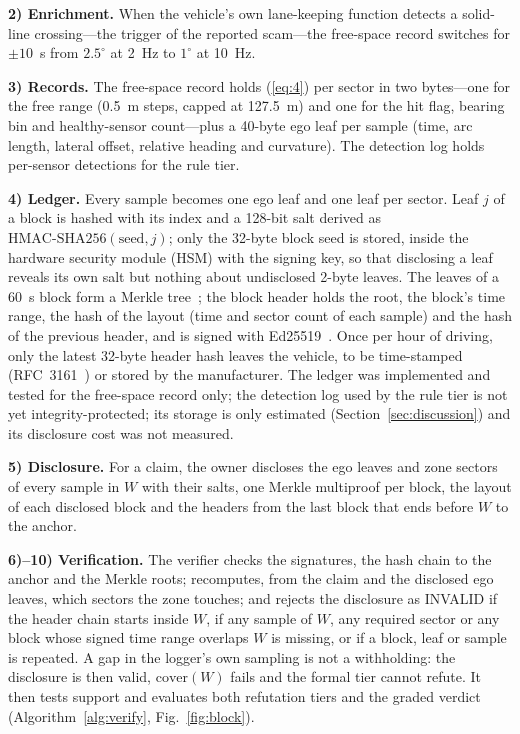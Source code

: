 \textbf{2) Enrichment.} When the vehicle's own lane-keeping function detects a solid-line crossing---the trigger of the reported scam---the free-space record switches for $\pm 10$~s from $2.5^\circ$ at 2~Hz to $1^\circ$ at 10~Hz.

\textbf{3) Records.} The free-space record holds (\ref{eq:4}) per sector in two bytes---one for the free range (0.5~m steps, capped at 127.5~m) and one for the hit flag, bearing bin and healthy-sensor count---plus a 40-byte ego leaf per sample (time, arc length, lateral offset, relative heading and curvature). The detection log holds per-sensor detections for the rule tier.

\textbf{4) Ledger.} Every sample becomes one ego leaf and one leaf per sector. Leaf $j$ of a block is hashed with its index and a 128-bit salt derived as $\mathrm{HMAC\text{-}SHA256}(\text{seed}, j)$; only the 32-byte block seed is stored, inside the hardware security module (HSM) with the signing key, so that disclosing a leaf reveals its own salt but nothing about undisclosed 2-byte leaves. The leaves of a 60~s block form a Merkle tree~\cite{b42}; the block header holds the root, the block's time range, the hash of the layout (time and sector count of each sample) and the hash of the previous header, and is signed with Ed25519~\cite{b43}. Once per hour of driving, only the latest 32-byte header hash leaves the vehicle, to be time-stamped (RFC~3161~\cite{b44}) or stored by the manufacturer. The ledger was implemented and tested for the free-space record only; the detection log used by the rule tier is not yet integrity-protected; its storage is only estimated (Section~\ref{sec:discussion}) and its disclosure cost was not measured.

\textbf{5) Disclosure.} For a claim, the owner discloses the ego leaves and zone sectors of every sample in $W$ with their salts, one Merkle multiproof per block, the layout of each disclosed block and the headers from the last block that ends before $W$ to the anchor.

\textbf{6)--10) Verification.} The verifier checks the signatures, the hash chain to the anchor and the Merkle roots; recomputes, from the claim and the disclosed ego leaves, which sectors the zone touches; and rejects the disclosure as INVALID if the header chain starts inside $W$, if any sample of $W$, any required sector or any block whose signed time range overlaps $W$ is missing, or if a block, leaf or sample is repeated. A gap in the logger's own sampling is not a withholding: the disclosure is then valid, $\mathrm{cover}(W)$ fails and the formal tier cannot refute. It then tests support and evaluates both refutation tiers and the graded verdict (Algorithm~\ref{alg:verify}, Fig.~\ref{fig:block}).

